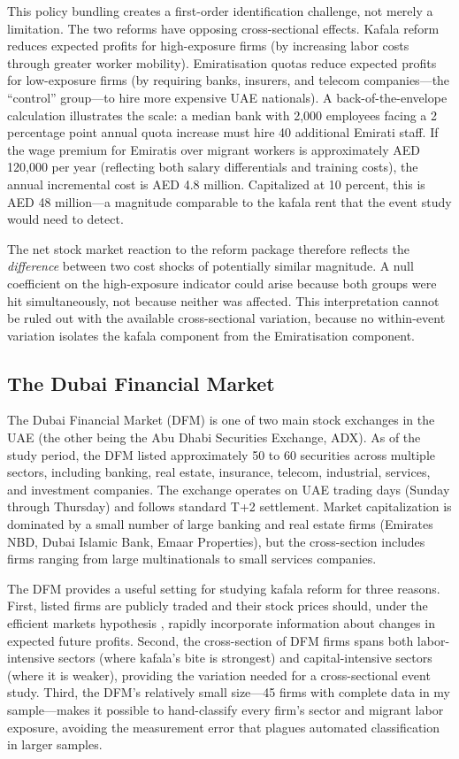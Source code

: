 \documentclass[12pt]{article}
\begin{document}
This policy bundling creates a first-order identification challenge, not merely a limitation. The two reforms have opposing cross-sectional effects. Kafala reform reduces expected profits for high-exposure firms (by increasing labor costs through greater worker mobility). Emiratisation quotas reduce expected profits for low-exposure firms (by requiring banks, insurers, and telecom companies---the ``control'' group---to hire more expensive UAE nationals). A back-of-the-envelope calculation illustrates the scale: a median bank with 2,000 employees facing a 2 percentage point annual quota increase must hire 40 additional Emirati staff. If the wage premium for Emiratis over migrant workers is approximately AED 120,000 per year (reflecting both salary differentials and training costs), the annual incremental cost is AED 4.8 million. Capitalized at 10 percent, this is AED 48 million---a magnitude comparable to the kafala rent that the event study would need to detect.

The net stock market reaction to the reform package therefore reflects the \emph{difference} between two cost shocks of potentially similar magnitude. A null coefficient on the high-exposure indicator could arise because both groups were hit simultaneously, not because neither was affected. This interpretation cannot be ruled out with the available cross-sectional variation, because no within-event variation isolates the kafala component from the Emiratisation component.

\subsection{The Dubai Financial Market}

The Dubai Financial Market (DFM) is one of two main stock exchanges in the UAE (the other being the Abu Dhabi Securities Exchange, ADX). As of the study period, the DFM listed approximately 50 to 60 securities across multiple sectors, including banking, real estate, insurance, telecom, industrial, services, and investment companies. The exchange operates on UAE trading days (Sunday through Thursday) and follows standard T+2 settlement. Market capitalization is dominated by a small number of large banking and real estate firms (Emirates NBD, Dubai Islamic Bank, Emaar Properties), but the cross-section includes firms ranging from large multinationals to small services companies.

The DFM provides a useful setting for studying kafala reform for three reasons. First, listed firms are publicly traded and their stock prices should, under the efficient markets hypothesis \citep{fama1969adjustment}, rapidly incorporate information about changes in expected future profits. Second, the cross-section of DFM firms spans both labor-intensive sectors (where kafala's bite is strongest) and capital-intensive sectors (where it is weaker), providing the variation needed for a cross-sectional event study. Third, the DFM's relatively small size---45 firms with complete data in my sample---makes it possible to hand-classify every firm's sector and migrant labor exposure, avoiding the measurement error that plagues automated classification in larger samples.
\end{document}
